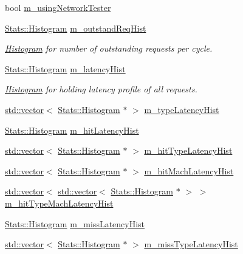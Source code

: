 \begin{DoxyCompactItemize}
\item 
bool \hyperlink{classSequencer_a6e3aaea8b048e1811c53f89dfb99260e}{m\_\-usingNetworkTester}
\item 
\hyperlink{classStats_1_1Histogram}{Stats::Histogram} \hyperlink{classSequencer_a24e9160c0860bc93a5f57de63544fe65}{m\_\-outstandReqHist}
\begin{DoxyCompactList}\small\item\em \hyperlink{classHistogram}{Histogram} for number of outstanding requests per cycle. \item\end{DoxyCompactList}\item 
\hyperlink{classStats_1_1Histogram}{Stats::Histogram} \hyperlink{classSequencer_aeb3fc96d5f4638c5599ed141c6c6bda7}{m\_\-latencyHist}
\begin{DoxyCompactList}\small\item\em \hyperlink{classHistogram}{Histogram} for holding latency profile of all requests. \item\end{DoxyCompactList}\item 
\hyperlink{classstd_1_1vector}{std::vector}$<$ \hyperlink{classStats_1_1Histogram}{Stats::Histogram} $\ast$ $>$ \hyperlink{classSequencer_a21453ca0672126e1c0e204b7c60b3340}{m\_\-typeLatencyHist}
\item 
\hyperlink{classStats_1_1Histogram}{Stats::Histogram} \hyperlink{classSequencer_aa7b4f1cb2f6f69fac85f5fa0be12f95a}{m\_\-hitLatencyHist}
\item 
\hyperlink{classstd_1_1vector}{std::vector}$<$ \hyperlink{classStats_1_1Histogram}{Stats::Histogram} $\ast$ $>$ \hyperlink{classSequencer_aeecaf5411cd3b34435f621db03387b67}{m\_\-hitTypeLatencyHist}
\item 
\hyperlink{classstd_1_1vector}{std::vector}$<$ \hyperlink{classStats_1_1Histogram}{Stats::Histogram} $\ast$ $>$ \hyperlink{classSequencer_add8e2c73ddfe42f1b177e641a0e626d5}{m\_\-hitMachLatencyHist}
\item 
\hyperlink{classstd_1_1vector}{std::vector}$<$ \hyperlink{classstd_1_1vector}{std::vector}$<$ \hyperlink{classStats_1_1Histogram}{Stats::Histogram} $\ast$ $>$ $>$ \hyperlink{classSequencer_aaf855f02483dc21743651007a759ea77}{m\_\-hitTypeMachLatencyHist}
\item 
\hyperlink{classStats_1_1Histogram}{Stats::Histogram} \hyperlink{classSequencer_aff6841cbe8b6a9be485b4c45a8208f93}{m\_\-missLatencyHist}
\item 
\hyperlink{classstd_1_1vector}{std::vector}$<$ \hyperlink{classStats_1_1Histogram}{Stats::Histogram} $\ast$ $>$ \hyperlink{classSequencer_ac5a934c0abe9f0185357eb76de27dee3}{m\_\-missTypeLatencyHist}

\end{DoxyCompactItemize}
